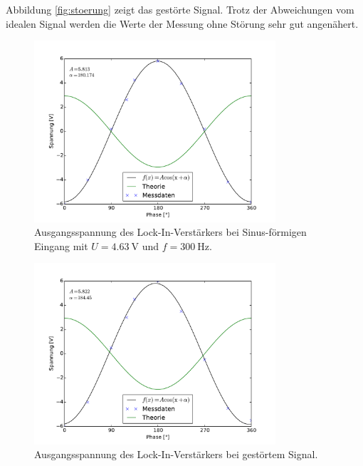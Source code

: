 Abbildung \ref{fig:stoerung} zeigt das gestörte Signal. 
Trotz der Abweichungen vom idealen Signal werden die Werte der Messung ohne Störung sehr gut angenähert.
\begin{figure}[hp]
	\centering
	\includegraphics[width=0.8\textwidth]{Bilder/AusgangSpannung.pdf}
	\caption{Ausgangsspannung des Lock-In-Verstärkers bei Sinus-förmigen Eingang mit $U = \SI{4.63}{\volt}$ und $f = \SI{300}{\hertz}$.}
	\label{diag:spannung}
\end{figure}

\begin{figure}[hp]
	\centering
	\includegraphics[width=0.8\textwidth]{Bilder/AusgangStoerung.pdf}
	\caption{Ausgangsspannung des Lock-In-Verstärkers bei gestörtem Signal.}
	\label{diag:stoerung}
\end{figure}


